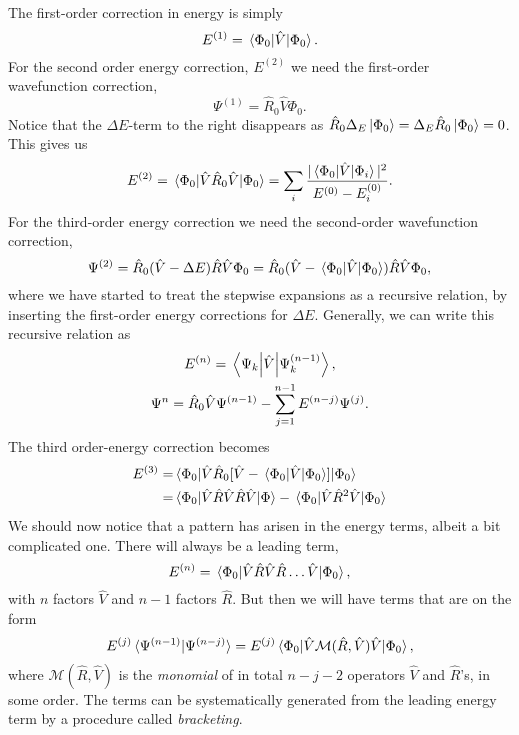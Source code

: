 The first-order correction in energy is simply
\begin{equation}
    E^{(1)} = \mel{\Phi_0}{\hat{V}}{\Phi_0}.
\end{equation}
For the second order energy correction, $E^{(2)}$ we need the first-order 
wavefunction correction,
\begin{equation}
    \Psi^{(1)} = \hat{R}_0\hat{V}\Phi_0.
\end{equation}
Notice that the $\Delta E$-term to the right disappears as 
$\hat{R}_0\Delta_E\ket{\Phi_0} = \Delta_E\hat{R}_0\ket{\Phi_0} = 0$.
This gives us
\begin{equation}
    E^{(2)} = \mel{\Phi_0}{\hat{V}\hat{R}_0\hat{V}}{\Phi_0}
        = \sum_{i} \frac{|\mel{\Phi_0}{\hat{V}}{\Phi_i}|^2}{E^{(0)} - E^{(0)}_i}.
\end{equation}
For the third-order energy correction we need the second-order wavefunction correction,
\begin{equation}
    \Psi^{(2)} = \hat{R}_0(\hat{V} - \Delta E)\hat{R}\hat{V} \Phi_0
        = \hat{R}_0(\hat{V} - \mel{\Phi_0}{\hat{V}}{\Phi_0})\hat{R}\hat{V} \Phi_0,
\end{equation}
where we have started to treat the stepwise expansions as a recursive relation, by 
inserting the first-order energy corrections for $\Delta E$. Generally, we can 
write this recursive relation as
\begin{gather}
    E^{(n)} = \mel{\Psi_k}{\hat{V}}{\Psi^{(n-1)}_k}, \\
    \label{eq:recursive_relation_RSPT_wavefunction}
    \Psi^{n} = \hat{R}_0 \hat{V}\Psi^{(n-1)} - \sum_{j=1}^{n-1}E^{(n-j)} \Psi^{(j)}.
\end{gather}
The third order-energy correction becomes
\begin{equation}
    \begin{aligned}
    \label{eq:third_order_RSPT_energy}
    E^{(3)} =& \mel{\Phi_0}{\hat{V}\hat{R}_0[\hat{V} - \mel{\Phi_0}{\hat{V}}{\Phi_0}]}{\Phi_0} \\
        =& \mel{\Phi_0}{\hat{V}\hat{R}\hat{V}\hat{R}\hat{V}}{\Phi}
            - \mel{\Phi_0}{\hat{V} \hat{R}^2\hat{V}}{\Phi_0}
    \end{aligned}
\end{equation}
We should now notice that a pattern has arisen in the energy terms, albeit a bit complicated one. 
There will always be a leading term,
\begin{equation}
    E^{(n)} = \mel{\Phi_0}{\hat{V}\hat{R}\hat{V}\hat{R}\dots\hat{V}}{\Phi_0},
\end{equation}
with $n$ factors $\hat{V}$ and $n-1$ factors $\hat{R}$. But then we will have 
terms that are on the form 
\begin{equation}
    E^{(j)}\braket*{\Psi^{(n-1)}}{\Psi^{(n-j)}} 
    = E^{(j)}\mel{\Phi_0}{\hat{V}\mathcal{M}(\hat{R}, \hat{V})\hat{V}}{\Phi_0},
\end{equation}
where $\mathcal{M}(\hat{R}, \hat{V})$ is the \emph{monomial} of in total 
$n - j - 2$ operators $\hat{V}$ and $\hat{R}$'s, in some order. The terms 
can be systematically generated from the leading energy term by a procedure called 
\emph{bracketing}.

